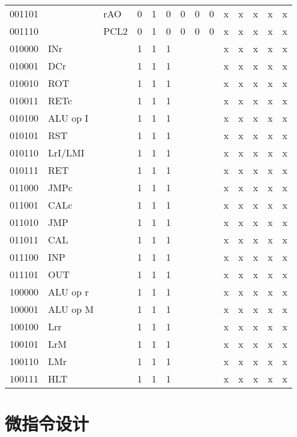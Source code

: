 \documentclass[10pt]{book}
\begin{document}
\begin{longtable}{|l|l|l|c|c|c|c|c|c|c|c|c|c|c|}
001101 	&			& rAO  		& 0 & 1 & 0   & 0 & 0 & 0   & x & x & x & x & x \\
001110 	&			& PCL2 		& 0 & 1 & 0   & 0 & 0 & 0   & x & x & x & x & x \\
010000	& INr		& 			& 1 & 1 & 1	  &   &   &     & x & x & x & x & x \\
010001	& DCr		& 			& 1 & 1 & 1	  &   &   &     & x & x & x & x & x \\
010010	& ROT		&			& 1 & 1 & 1	  &   &   &     & x & x & x & x & x \\
010011	& RETc		&			& 1 & 1 & 1	  &   &   &     & x & x & x & x & x \\
010100	& ALU op I 	& 			& 1 & 1 & 1	  &   &   &     & x & x & x & x & x \\
010101	& RST		&			& 1 & 1 & 1	  &   &   &     & x & x & x & x & x \\
010110	& LrI/LMI	&			& 1 & 1 & 1	  &   &   &     & x & x & x & x & x \\
010111	& RET		&			& 1 & 1 & 1	  &   &   &     & x & x & x & x & x \\
011000	& JMPc		&			& 1 & 1 & 1	  &   &   &     & x & x & x & x & x \\
011001	& CALc		&			& 1 & 1 & 1	  &   &   &     & x & x & x & x & x \\
011010	& JMP		&			& 1 & 1 & 1	  &   &   &     & x & x & x & x & x \\
011011	& CAL		&			& 1 & 1 & 1	  &   &   &     & x & x & x & x & x \\
011100	& INP		&			& 1 & 1 & 1	  &   &   &     & x & x & x & x & x \\
011101	& OUT		&			& 1 & 1 & 1	  &   &   &     & x & x & x & x & x \\
100000	& ALU op r 	&			& 1 & 1 & 1	  &   &   &     & x & x & x & x & x \\
100001	& ALU op M 	&			& 1 & 1 & 1	  &   &   &     & x & x & x & x & x \\
100100	& Lrr		&			& 1 & 1 & 1	  &   &   &     & x & x & x & x & x \\
100101	& LrM		&			& 1 & 1 & 1	  &   &   &     & x & x & x & x & x \\
100110	& LMr		&			& 1 & 1 & 1	  &   &   &     & x & x & x & x & x \\
100111	& HLT		&			& 1 & 1 & 1	  &   &   &     & x & x & x & x & x \\
\end{longtable}

\section{微指令设计}
\end{document}
